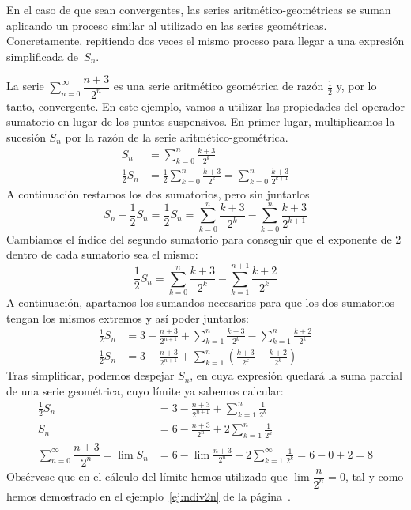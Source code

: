 En el caso de que sean convergentes, las series aritmético-geométricas se suman aplicando un proceso similar al utilizado en las series geométricas. 
Concretamente, repitiendo dos veces el mismo proceso para llegar a una expresión simplificada 
de~$S_n$.

\begin{ejemplo}\label{ej:arit-geom}
La serie $\displaystyle\sum_{n=0}^\infty\dfrac{n+3}{2^n}$ es una serie aritmético geométrica de razón $\frac12$ y, por lo tanto, convergente.
En este ejemplo, vamos a utilizar las propiedades del operador sumatorio en lugar de los puntos suspensivos.
En primer lugar, multiplicamos la sucesión $S_n$ por la razón de la serie aritmético-geométrica.
\begin{align*}
S_n &=\sum_{k=0}^n \frac{k+3}{2^{k}} \\
\frac12 S_n	&=\frac12\sum_{k=0}^n \frac{k+3}{2^{k}}
=\sum_{k=0}^n \frac{k+3}{2^{k+1}}
\end{align*}
A continuación restamos los dos sumatorios, pero sin juntarlos
\[
S_n-\frac12S_n =\frac12S_n =
\sum_{k=0}^n \frac{k+3}{2^{k}}-\sum_{k=0}^n \frac{k+3}{2^{k+1}}
\]
Cambiamos el índice del segundo sumatorio para conseguir que el exponente de 2 dentro de cada sumatorio sea el mismo:
\[
\frac12S_n =
\sum_{k=0}^n \frac{k+3}{2^{k}} -\sum_{k=1}^{n+1} \frac{k+2}{2^{k}}
\]
A continuación, apartamos los sumandos necesarios para que los dos sumatorios tengan los mismos extremos y así poder juntarlos:
\begin{align*}
\frac12S_n &=3-\frac{n+3}{2^{n+1}}
+\sum_{k=1}^n \frac{k+3}{2^{k}} -\sum_{k=1}^{n} \frac{k+2}{2^{k}}
\\
\frac12S_n &=3-\frac{n+3}{2^{n+1}}
+\sum_{k=1}^n \left(\frac{k+3}{2^{k}}-\frac{k+2}{2^{k}}\right)
\end{align*}
Tras simplificar, podemos despejar $S_n$, en cuya expresión quedará la suma parcial de una serie geométrica, cuyo límite ya sabemos calcular:
\begin{align*}
\frac12S_n &=3-\frac{n+3}{2^{n+1}}
+\sum_{k=1}^n \frac{1}{2^{k}}\\
S_n &=6-\frac{n+3}{2^{n}}
+2\sum_{k=1}^n \frac{1}{2^{k}}\\
\sum_{n=0}^\infty\dfrac{n+3}{2^n}=\lim S_n &=6-\lim\frac{n+3}{2^{n}}
+2\sum_{k=1}^\infty \frac{1}{2^{k}}=6-0+2=8
\end{align*}
Obsérvese que en el cálculo del límite hemos utilizado que $\lim\dfrac{n}{2^n}=0$, 
tal y como hemos demostrado en el ejemplo~\ref{ej:ndiv2n} de la página~\pageref{ej:ndiv2n}.\fej 
\end{ejemplo} 
